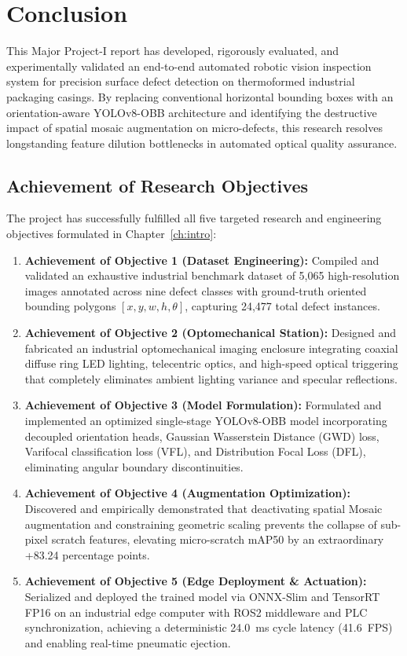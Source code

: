 \chapter{Conclusion}
\label{ch:conclusion}

This Major Project-I report has developed, rigorously evaluated, and experimentally validated an end-to-end automated robotic vision inspection system for precision surface defect detection on thermoformed industrial packaging casings. By replacing conventional horizontal bounding boxes with an orientation-aware YOLOv8-OBB architecture and identifying the destructive impact of spatial mosaic augmentation on micro-defects, this research resolves longstanding feature dilution bottlenecks in automated optical quality assurance.

\section{Achievement of Research Objectives}
\label{sec:achievement}

The project has successfully fulfilled all five targeted research and engineering objectives formulated in Chapter~\ref{ch:intro}:

\begin{enumerate}
\item \textbf{Achievement of Objective 1 (Dataset Engineering):} Compiled and validated an exhaustive industrial benchmark dataset of 5,065 high-resolution images annotated across nine defect classes with ground-truth oriented bounding polygons $[x, y, w, h, \theta]$, capturing 24,477 total defect instances.
\item \textbf{Achievement of Objective 2 (Optomechanical Station):} Designed and fabricated an industrial optomechanical imaging enclosure integrating coaxial diffuse ring LED lighting, telecentric optics, and high-speed optical triggering that completely eliminates ambient lighting variance and specular reflections.
\item \textbf{Achievement of Objective 3 (Model Formulation):} Formulated and implemented an optimized single-stage YOLOv8-OBB model incorporating decoupled orientation heads, Gaussian Wasserstein Distance (GWD) loss, Varifocal classification loss (VFL), and Distribution Focal Loss (DFL), eliminating angular boundary discontinuities.
\item \textbf{Achievement of Objective 4 (Augmentation Optimization):} Discovered and empirically demonstrated that deactivating spatial Mosaic augmentation and constraining geometric scaling prevents the collapse of sub-pixel scratch features, elevating micro-scratch mAP50 by an extraordinary +83.24 percentage points.
\item \textbf{Achievement of Objective 5 (Edge Deployment \& Actuation):} Serialized and deployed the trained model via ONNX-Slim and TensorRT FP16 on an industrial edge computer with ROS2 middleware and PLC synchronization, achieving a deterministic 24.0~ms cycle latency (41.6~FPS) and enabling real-time pneumatic ejection.
\end{enumerate}

